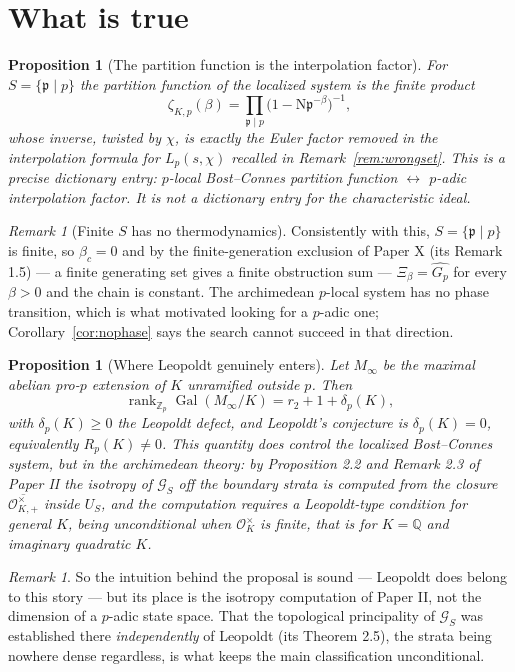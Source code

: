 \documentclass[11pt]{amsart}
\numberwithin{equation}{section}
\newtheorem{proposition}[theorem]{Proposition}
\theoremstyle{definition}
\theoremstyle{remark}
\newtheorem{remark}[theorem]{Remark}
\newcommand{\Z}{\mathbb{Z}}
\newcommand{\Q}{\mathbb{Q}}
\newcommand{\cO}{\mathcal{O}}
\newcommand{\pp}{\mathfrak{p}}
\newcommand{\Ns}{\mathrm{N}}
\newcommand{\Gal}{\operatorname{Gal}}
\newcommand{\rank}{\operatorname{rank}}
\begin{document}
\section{What is true}\label{sec:true}

\begin{proposition}[The partition function is the interpolation factor]\label{prop:euler}
For $S=\{\pp\mid p\}$ the partition function of the localized system is the finite product
\[
\zeta_{K,p}(\beta)=\prod_{\pp\mid p}\bigl(1-\Ns\pp^{-\beta}\bigr)^{-1},
\]
whose inverse, twisted by $\chi$, is exactly the Euler factor removed in the interpolation
formula for $L_p(s,\chi)$ recalled in Remark~\ref{rem:wrongset}. This is a precise
dictionary entry: \emph{$p$-local Bost--Connes partition function $\leftrightarrow$ $p$-adic
interpolation factor.} It is not a dictionary entry for the characteristic ideal.
\end{proposition}

\begin{remark}[Finite $S$ has no thermodynamics]\label{rem:finiteS}
Consistently with this, $S=\{\pp\mid p\}$ is finite, so $\beta_c=0$ and by
the finite-generation exclusion of Paper X (its Remark 1.5) --- a finite generating set gives a finite obstruction sum ---
$\Xi_\beta=\widehat{G_p}$ for every $\beta>0$ and the chain is constant. The archimedean
$p$-local system has no phase transition, which is what motivated looking for a $p$-adic one;
Corollary~\ref{cor:nophase} says the search cannot succeed in that direction.
\end{remark}

\begin{proposition}[Where Leopoldt genuinely enters]\label{prop:leopoldt}
Let $M_\infty$ be the maximal abelian pro-$p$ extension of $K$ unramified outside $p$. Then
\[
\rank_{\Z_p}\Gal(M_\infty/K)=r_2+1+\delta_p(K),
\]
with $\delta_p(K)\ge0$ the Leopoldt defect, and Leopoldt's conjecture is $\delta_p(K)=0$,
equivalently $R_p(K)\ne0$. This quantity does control the localized Bost--Connes system, but
in the archimedean theory: by Proposition 2.2 and Remark 2.3 of Paper II the isotropy of $\mathcal G_S$ off
the boundary strata is computed from the closure $\overline{\cO^\times_{K,+}}$ inside
$U_S$, and the computation requires a Leopoldt-type condition for general $K$, being
unconditional when $\cO_K^\times$ is finite, that is for $K=\Q$ and imaginary quadratic $K$.
\end{proposition}

\begin{remark}\label{rem:leopoldtplace}
So the intuition behind the proposal is sound --- Leopoldt does belong to this story --- but
its place is the isotropy computation of Paper II, not the dimension of a $p$-adic
state space. That the topological principality of $\mathcal G_S$ was established there
\emph{independently} of Leopoldt (its Theorem 2.5), the strata being nowhere dense regardless, is what keeps the
main classification unconditional.
\end{remark}
\end{document}
